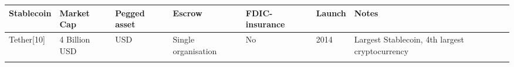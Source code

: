\documentclass[english,]{IEEEtran}
\begin{document}
\begin{table}[t]\begin{center}\begin{supertabular}[]{@{}lllllll@{}}
\toprule
\begin{minipage}[b]{0.14\textwidth}\raggedright
Stablecoin\strut
\end{minipage} & \begin{minipage}[b]{0.08\textwidth}\raggedright
Market Cap\strut
\end{minipage} & \begin{minipage}[b]{0.07\textwidth}\raggedright
Pegged asset\strut
\end{minipage} & \begin{minipage}[b]{0.10\textwidth}\raggedright
Escrow\strut
\end{minipage} & \begin{minipage}[b]{0.07\textwidth}\raggedright
FDIC-insurance\strut
\end{minipage} & \begin{minipage}[b]{0.04\textwidth}\raggedright
Launch\strut
\end{minipage} & \begin{minipage}[b]{0.30\textwidth}\raggedright
Notes\strut
\end{minipage}\tabularnewline
\midrule
\begin{minipage}[t]{0.14\textwidth}\raggedright
Tether{[}10{]}\strut
\end{minipage} & \begin{minipage}[t]{0.08\textwidth}\raggedright
4 Billion USD\strut
\end{minipage} & \begin{minipage}[t]{0.07\textwidth}\raggedright
USD\strut
\end{minipage} & \begin{minipage}[t]{0.10\textwidth}\raggedright
Single organisation\strut
\end{minipage} & \begin{minipage}[t]{0.07\textwidth}\raggedright
No\strut
\end{minipage} & \begin{minipage}[t]{0.04\textwidth}\raggedright
2014\strut
\end{minipage} & \begin{minipage}[t]{0.30\textwidth}\raggedright
Largest Stablecoin, 4th largest cryptocurrency\strut
\end{minipage}\tabularnewline
\begin{minipage}[t]{0.14\textwidth}\raggedright

\end{minipage}
\end{supertabular}
\end{center}
\end{table}
\end{document}
